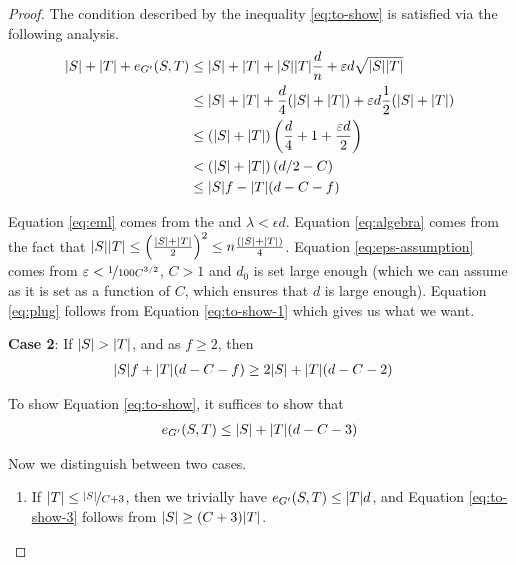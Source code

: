 \documentclass[11pt]{article}
\begin{document}
\begin{proof}
  The condition described by the inequality \eqref{eq:to-show} is satisfied via the following analysis.
\begin{align}
  |S| + |T| + \CutEdges{S}{T}{G'} &\le  |S| + |T| + |S||T|\frac{d}{n} + \epsilon d \sqrt{\Size{S}\Size{T}} \label{eq:eml}\\
                                 &\le |S| + |T| + \frac{d}{4}(\Size{S} + \Size{T}) + \epsilon d \frac{1}{2}(\Size{S} + \Size{T}) \label{eq:algebra}\\
                                 &\le (\Size{S} + \Size{T})\left(\frac{d}{4} + 1 + \frac{
                                   \epsilon d}{2}\right) \\
                                 &<  (\Size{S} + \Size{T})\left(d/2-C\right) \label{eq:eps-assumption}\\
                                 &\le \Size{S}f - \Size{T}(d-C-f) \label{eq:plug}
 \end{align}  
  
Equation \eqref{eq:eml} comes from the  and $\lambda < \epsilon d$.
Equation \eqref{eq:algebra} comes from the fact that $\Size{S}\Size{T} \leq \left(\frac{\Size{S}+\Size{T}}{2}\right)^2 \le n\frac{(\Size{S}+\Size{T})}{4}$.
Equation \eqref{eq:eps-assumption} comes from $\epsilon < \nicefrac{1}{100C^{3/2}}$, $C >1$ and $d_0$ is set large enough (which we can assume as it is set as a function of $C$, which ensures that $d$ is large enough).
Equation \eqref{eq:plug} follows from Equation \eqref{eq:to-show-1} which gives us what we want.

\textbf{Case 2}: If $\Size{S} > \Size{T}$, and as $f \ge 2$, then
  \begin{align}
    \Size{S}f +  \Size{T}(d-C-f)  &\ge 2\Size{S} +\Size{T}(d-C-2) \label{eq:to-show-2}
  \end{align}
  
  To show Equation \eqref{eq:to-show}, it suffices to show that
\begin{align}
  \CutEdges{S}{T}{G'} \leq \Size{S} + \Size{T}(d-C-3) \label{eq:to-show-3}
\end{align}

Now we distinguish between two cases.

\begin{enumerate}

\item{
    If $\Size{T} \le \nicefrac{\Size{S}}{C+3}$, then we trivially have $\CutEdges{S}{T}{G'} \leq \Size{T}d$, and Equation \eqref{eq:to-show-3} follows from $\Size{S} \geq (C+3)\Size{T}$.
  }


\end{enumerate}
\end{proof}
\end{document}
